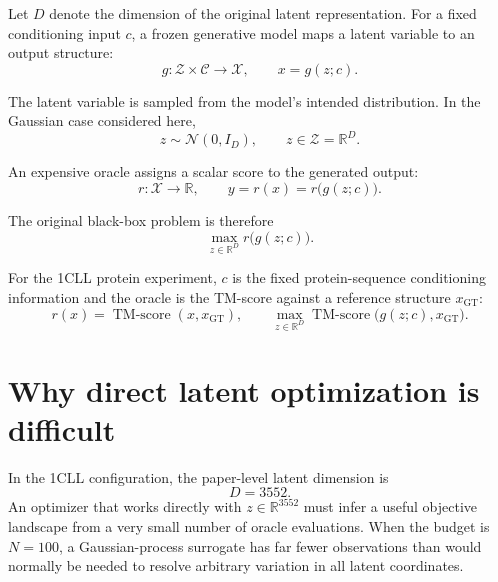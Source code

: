 \documentclass[11pt]{article}
\newcommand{\R}{\mathbb{R}}
\newcommand{\latent}{\mathcal{Z}}
\newcommand{\structure}{\mathcal{X}}
\DeclareMathOperator{\TMScore}{TM\text{-}score}
\begin{document}
Let \(D\) denote the dimension of the original latent representation.  For a
fixed conditioning input \(c\), a frozen generative model maps a latent
variable to an output structure:
\begin{equation}
    g:\latent\times\mathcal{C}\longrightarrow\structure,
    \qquad x=g(z;c).
    \label{eq:generator}
\end{equation}

The latent variable is sampled from the model's intended distribution.  In the
Gaussian case considered here,
\begin{equation}
    z\sim\mathcal{N}(0,I_D),
    \qquad z\in\latent=\R^D.
    \label{eq:latent-distribution}
\end{equation}

An expensive oracle assigns a scalar score to the generated output:
\begin{equation}
    r:\structure\longrightarrow\R,
    \qquad y=r(x)=r\bigl(g(z;c)\bigr).
    \label{eq:oracle}
\end{equation}

The original black-box problem is therefore
\begin{equation}
    \max_{z\in\R^D} r\bigl(g(z;c)\bigr).
    \label{eq:original-objective}
\end{equation}

For the 1CLL protein experiment, \(c\) is the fixed protein-sequence
conditioning information and the oracle is the TM-score against a reference
structure \(x_{\mathrm{GT}}\):
\begin{equation}
    r(x)=\TMScore(x,x_{\mathrm{GT}}),
    \qquad
    \max_{z\in\R^D}\TMScore\bigl(g(z;c),x_{\mathrm{GT}}\bigr).
    \label{eq:tm-score-objective}
\end{equation}

\section{Why direct latent optimization is difficult}
\label{sec:direct-optimization}

In the 1CLL configuration, the paper-level latent dimension is
\begin{equation}
    D=3552.
    \label{eq:latent-dimension}
\end{equation}
An optimizer that works directly with \(z\in\R^{3552}\) must infer a useful
objective landscape from a very small number of oracle evaluations.  When the
budget is \(N=100\), a Gaussian-process surrogate has far fewer observations
than would normally be needed to resolve arbitrary variation in all latent
coordinates.
\end{document}
